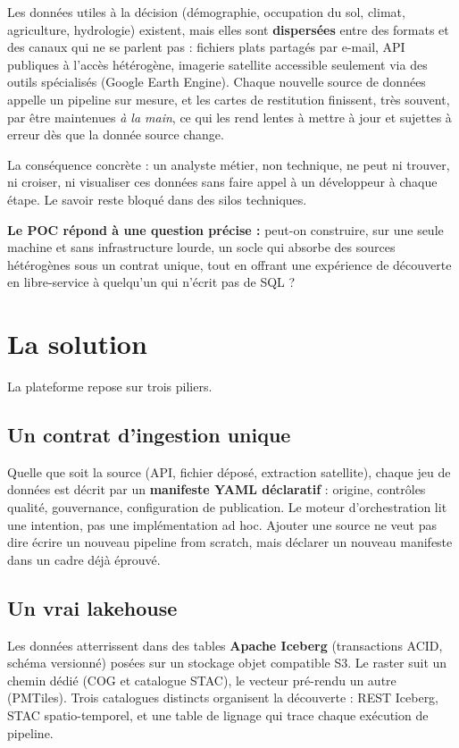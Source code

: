 \documentclass[11pt,a4paper]{article}
\begin{document}
Les données utiles à la décision (démographie, occupation du sol, climat, agriculture, hydrologie) existent, mais elles sont \textbf{dispersées} entre des formats et des canaux qui ne se parlent pas : fichiers plats partagés par e-mail, API publiques à l'accès hétérogène, imagerie satellite accessible seulement via des outils spécialisés (Google Earth Engine). Chaque nouvelle source de données appelle un pipeline sur mesure, et les cartes de restitution finissent, très souvent, par être maintenues \emph{à la main}, ce qui les rend lentes à mettre à jour et sujettes à erreur dès que la donnée source change.

La conséquence concrète : un analyste métier, non technique, ne peut ni trouver, ni croiser, ni visualiser ces données sans faire appel à un développeur à chaque étape. Le savoir reste bloqué dans des silos techniques.

\begin{note}
\textbf{Le POC répond à une question précise :} peut-on construire, sur une seule machine et sans infrastructure lourde, un socle qui absorbe des sources hétérogènes sous un contrat unique, tout en offrant une expérience de découverte en libre-service à quelqu'un qui n'écrit pas de SQL ?
\end{note}

\section{La solution}

La plateforme repose sur trois piliers.

\subsection{Un contrat d'ingestion unique}
Quelle que soit la source (API, fichier déposé, extraction satellite), chaque jeu de données est décrit par un \textbf{manifeste YAML déclaratif} : origine, contrôles qualité, gouvernance, configuration de publication. Le moteur d'orchestration lit une intention, pas une implémentation ad hoc. Ajouter une source ne veut pas dire écrire un nouveau pipeline from scratch, mais déclarer un nouveau manifeste dans un cadre déjà éprouvé.

\subsection{Un vrai lakehouse}
Les données atterrissent dans des tables \textbf{Apache Iceberg} (transactions ACID, schéma versionné) posées sur un stockage objet compatible S3. Le raster suit un chemin dédié (COG et catalogue STAC), le vecteur pré-rendu un autre (PMTiles). Trois catalogues distincts organisent la découverte : REST Iceberg, STAC spatio-temporel, et une table de lignage qui trace chaque exécution de pipeline.
\end{document}
